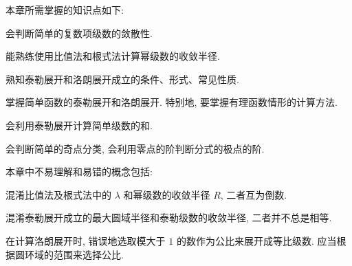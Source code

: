 本章所需掌握的知识点如下:
\begin{enumpar}
  \item 会判断简单的复数项级数的敛散性.
  \item 能熟练使用比值法和根式法计算幂级数的收敛半径.
  \item 熟知泰勒展开和洛朗展开成立的条件、形式、常见性质.
  \item 掌握简单函数的泰勒展开和洛朗展开. 特别地, 要掌握有理函数情形的计算方法.
  \item 会利用泰勒展开计算简单级数的和.
  \item 会判断简单的奇点分类, 会利用零点的阶判断分式的极点的阶.
\end{enumpar}

本章中不易理解和易错的概念包括:
\begin{enumpar}
  \item 混淆比值法及根式法中的 $\lambda$ 和幂级数的收敛半径 $R$, 二者互为倒数.
  \item 混淆泰勒展开成立的最大圆域半径和泰勒级数的收敛半径, 二者并不总是相等.
  \item 在计算洛朗展开时, 错误地选取模大于 $1$ 的数作为公比来展开成等比级数. 应当根据圆环域的范围来选择公比.
\end{enumpar}




